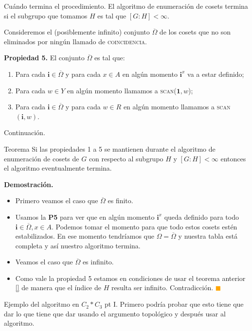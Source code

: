 \documentclass[aspectratio=169, 9pt]{beamer}
\renewcommand\qedsymbol{\textcolor{orange}{$\blacksquare$}}
\newcommand{\coin}{\textsc{coincidencia}}
\newcommand{\scan}{\textsc{scan}}
\newcommand{\ol}{\overline}
\begin{document}
\begin{frame}[fragile]{Cuándo termina el procedimiento.}
	El algoritmo de enumeración de cosets termina si el subgrupo que tomamos $H$ es tal que $[G:H] < \infty$.
	\pause

	Consideremos el (posiblemente infinito) conjunto $\ol \Omega$ de los cosets que no son eliminados por ningún llamado de \coin.

	\pause
	
	\textbf{Propiedad 5.} El conjunto $\ol \Omega$ es tal que:
	\begin{enumerate}
		\item Para cada $\textbf{i} \in \overline \Omega$ y para cada $x \in A$ en algún momento $\textbf{i}^x$ va a estar definido;
		\item Para cada $w \in Y$ en algún momento llamamos a \scan($\textbf{1},w$);
		\item Para cada $\textbf{i} \in \ol \Omega$ y para cada $w \in R$ en algún momento llamamos a \scan$(\textbf{i}, w)$.
	\end{enumerate}
\end{frame}

\begin{frame}[fragile]{Continuación.}
	\begin{alertblock}{Teorema}
		Si las propiedades 1 a 5 se mantienen durante el algoritmo de enumeración de cosets de $G$ con respecto al subgrupo $H$ y $[G:H] < \infty$ entonces el algoritmo eventualmente termina.
	\end{alertblock}
	\pause
	
	\textbf{Demostración.} 
	\begin{itemize}
		\item Primero veamos el caso que $\ol \Omega$ es finito.
		\pause
		\item Usamos la \textbf{P5} para ver que en algún momento $\textbf{i}^x$ queda definido para todo $\textbf{i} \in \ol\Omega, x \in A$.
		\pause 
		Podemos tomar el momento para que todo estos cosets estén estabilizados.
		\pause
		En ese momento tendríamos que $\Omega = \ol \Omega$ y nuestra tabla está completa y así nuestro algoritmo termina.
		\item Veamos el caso que $\ol \Omega$ es infinito.
		\pause
		\item Como vale la propiedad 5 estamos en condiciones de usar el teorema anterior \ref{} de manera que el índice de $H$ resulta ser infinito.
		Contradicción.
		\qedsymbol
	\end{itemize}
\end{frame}

\begin{frame}[fragile]{Ejemplo del algoritmo en $C_2 \ast C_3$ pt I.}
Primero podría probar que esto tiene que dar lo que tiene que dar usando el argumento topológico y después usar al algoritmo.
\end{frame}
\end{document}
